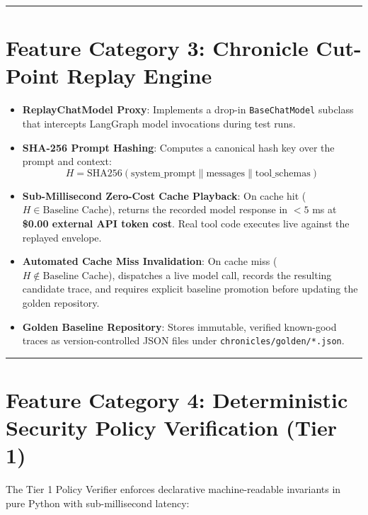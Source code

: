 \documentclass[10pt,a4paper]{article}
\begin{document}
\vspace{0.4em}
\hrule
\vspace{0.6em}

\section{Feature Category 3: Chronicle Cut-Point Replay Engine}

\begin{itemize}[leftmargin=1.5em,noitemsep]
    \item \textbf{ReplayChatModel Proxy}: Implements a drop-in \texttt{BaseChatModel} subclass that intercepts LangGraph model invocations during test runs.
    \item \textbf{SHA-256 Prompt Hashing}: Computes a canonical hash key over the prompt and context:
    \begin{equation}
        H = \text{SHA256}(\text{system\_prompt} \parallel \text{messages} \parallel \text{tool\_schemas})
    \end{equation}
    \item \textbf{Sub-Millisecond Zero-Cost Cache Playback}: On cache hit ($H \in \text{Baseline Cache}$), returns the recorded model response in $<5$ ms at \textbf{\$0.00 external API token cost}. Real tool code executes live against the replayed envelope.
    \item \textbf{Automated Cache Miss Invalidation}: On cache miss ($H \notin \text{Baseline Cache}$), dispatches a live model call, records the resulting candidate trace, and requires explicit baseline promotion before updating the golden repository.
    \item \textbf{Golden Baseline Repository}: Stores immutable, verified known-good traces as version-controlled JSON files under \texttt{chronicles/golden/*.json}.
\end{itemize}

\vspace{0.4em}
\hrule
\vspace{0.6em}

\section{Feature Category 4: Deterministic Security Policy Verification (Tier 1)}

The Tier 1 Policy Verifier enforces declarative machine-readable invariants in pure Python with sub-millisecond latency:
\end{document}
